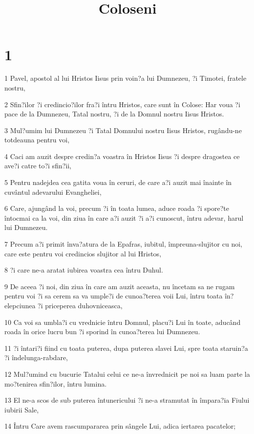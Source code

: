 

\title{Coloseni}


\chapter{1}

\par 1 Pavel, apostol al lui Hristos Iisus prin voin?a lui Dumnezeu, ?i Timotei, fratele nostru,
\par 2 Sfin?ilor ?i credincio?ilor fra?i întru Hristos, care sunt în Colose: Har voua ?i pace de la Dumnezeu, Tatal nostru, ?i de la Domnul nostru Iisus Hristos.
\par 3 Mul?umim lui Dumnezeu ?i Tatal Domnului nostru Iisus Hristos, rugându-ne totdeauna pentru voi,
\par 4 Caci am auzit despre credin?a voastra în Hristos Iisus ?i despre dragostea ce ave?i catre to?i sfin?ii,
\par 5 Pentru nadejdea cea gatita voua în ceruri, de care a?i auzit mai înainte în cuvântul adevarului Evangheliei,
\par 6 Care, ajungând la voi, precum ?i în toata lumea, aduce roada ?i spore?te întocmai ca la voi, din ziua în care a?i auzit ?i a?i cunoscut, întru adevar, harul lui Dumnezeu.
\par 7 Precum a?i primit înva?atura de la Epafras, iubitul, împreuna-slujitor cu noi, care este pentru voi credincios slujitor al lui Hristos,
\par 8 ?i care ne-a aratat iubirea voastra cea întru Duhul.
\par 9 De aceea ?i noi, din ziua în care am auzit aceasta, nu încetam sa ne rugam pentru voi ?i sa cerem sa va umple?i de cunoa?terea voii Lui, întru toata în?elepciunea ?i priceperea duhovniceasca,
\par 10 Ca voi sa umbla?i cu vrednicie întru Domnul, placu?i Lui în toate, aducând roada în orice lucru bun ?i sporind în cunoa?terea lui Dumnezeu.
\par 11 ?i întari?i fiind cu toata puterea, dupa puterea slavei Lui, spre toata staruin?a ?i îndelunga-rabdare,
\par 12 Mul?umind cu bucurie Tatalui celui ce ne-a învrednicit pe noi sa luam parte la mo?tenirea sfin?ilor, întru lumina.
\par 13 El ne-a scos de sub puterea întunericului ?i ne-a stramutat în împara?ia Fiului iubirii Sale,
\par 14 Întru Care avem rascumpararea prin sângele Lui, adica iertarea pacatelor;
